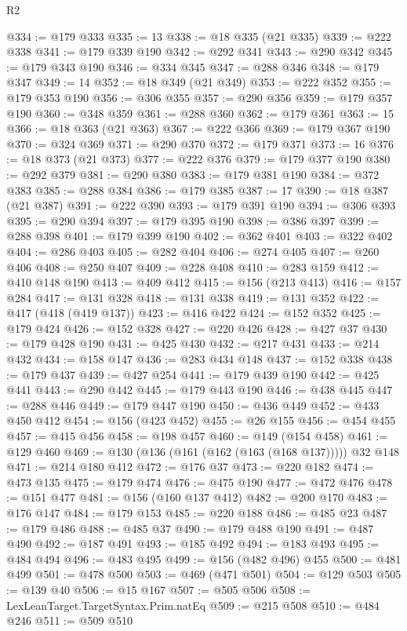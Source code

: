 \begin{lexlean}{R2}
\begin{coremodule}
@334 := @179 @333
@335 := 13
@338 := @18 @335 (@21 @335)
@339 := @222 @338
@341 := @179 @339 @190
@342 := @292 @341
@343 := @290 @342
@345 := @179 @343 @190
@346 := @334 @345
@347 := @288 @346
@348 := @179 @347
@349 := 14
@352 := @18 @349 (@21 @349)
@353 := @222 @352
@355 := @179 @353 @190
@356 := @306 @355
@357 := @290 @356
@359 := @179 @357 @190
@360 := @348 @359
@361 := @288 @360
@362 := @179 @361
@363 := 15
@366 := @18 @363 (@21 @363)
@367 := @222 @366
@369 := @179 @367 @190
@370 := @324 @369
@371 := @290 @370
@372 := @179 @371
@373 := 16
@376 := @18 @373 (@21 @373)
@377 := @222 @376
@379 := @179 @377 @190
@380 := @292 @379
@381 := @290 @380
@383 := @179 @381 @190
@384 := @372 @383
@385 := @288 @384
@386 := @179 @385
@387 := 17
@390 := @18 @387 (@21 @387)
@391 := @222 @390
@393 := @179 @391 @190
@394 := @306 @393
@395 := @290 @394
@397 := @179 @395 @190
@398 := @386 @397
@399 := @288 @398
@401 := @179 @399 @190
@402 := @362 @401
@403 := @322 @402
@404 := @286 @403
@405 := @282 @404
@406 := @274 @405
@407 := @260 @406
@408 := @250 @407
@409 := @228 @408
@410 := @283 @159
@412 := @410 @148 @190
@413 := @409 @412
@415 := @156 (@213 @413)
@416 := @157 @284
@417 := @131 @328
@418 := @131 @338
@419 := @131 @352
@422 := @417 (@418 (@419 @137))
@423 := @416 @422
@424 := @152 @352
@425 := @179 @424
@426 := @152 @328
@427 := @220 @426
@428 := @427 @37
@430 := @179 @428 @190
@431 := @425 @430
@432 := @217 @431
@433 := @214 @432
@434 := @158 @147
@436 := @283 @434 @148
@437 := @152 @338
@438 := @179 @437
@439 := @427 @254
@441 := @179 @439 @190
@442 := @425 @441
@443 := @290 @442
@445 := @179 @443 @190
@446 := @438 @445
@447 := @288 @446
@449 := @179 @447 @190
@450 := @436 @449
@452 := @433 @450 @412
@454 := @156 (@423 @452)
@455 := @26 @155
@456 := @454 @455
@457 := @415 @456
@458 := @198 @457
@460 := @149 (@154 @458)
@461 := @129 @460
@469 := @130 (@136 (@161 (@162 (@163 (@168 @137))))) @32 @148
@471 := @214 @180 @412
@472 := @176 @37
@473 := @220 @182
@474 := @473 @135
@475 := @179 @474
@476 := @475 @190
@477 := @472 @476
@478 := @151 @477
@481 := @156 (@160 @137 @412)
@482 := @200 @170
@483 := @176 @147
@484 := @179 @153
@485 := @220 @188
@486 := @485 @23
@487 := @179 @486
@488 := @485 @37
@490 := @179 @488 @190
@491 := @487 @490
@492 := @187 @491
@493 := @185 @492
@494 := @183 @493
@495 := @484 @494
@496 := @483 @495
@499 := @156 (@482 @496) @455
@500 := @481 @499
@501 := @478 @500
@503 := @469 (@471 @501)
@504 := @129 @503
@505 := @139 @40
@506 := @15 @167
@507 := @505 @506
@508 := LexLeanTarget.TargetSyntax.Prim.natEq
@509 := @215 @508
@510 := @484 @246
@511 := @509 @510

\end{coremodule}
\end{lexlean}
